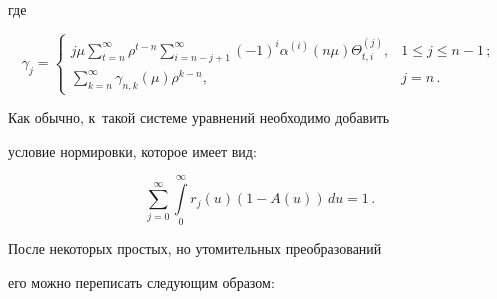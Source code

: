 где

$$

\gamma_{j}=\begin{cases}

\displaystyle j\mu \sum\limits_{t=n}^{\infty} \rho^{t-n} \sum\limits_{i=n-j+1}^{\infty} (-1)^i

\alpha^{(i)}(n \mu) \Theta^{(j)}_{t,i},

& 1\le j \le n-1\,;\\

\displaystyle \sum\limits_{k=n}^{\infty} \gamma_{n,k}(\mu) \rho^{k-n}, & j=n\,.

\end{cases}

$$

Как обычно, к~такой системе уравнений необходимо добавить

условие нормировки, которое имеет вид:

$$

\sum\limits_{j=0}^\infty \int\limits_0^\infty r_j(u) 

(1-A(u))\,du=1\,.

$$

%

После некоторых простых, но утомительных преобразований

его можно переписать сле\-ду\-ющим образом:

